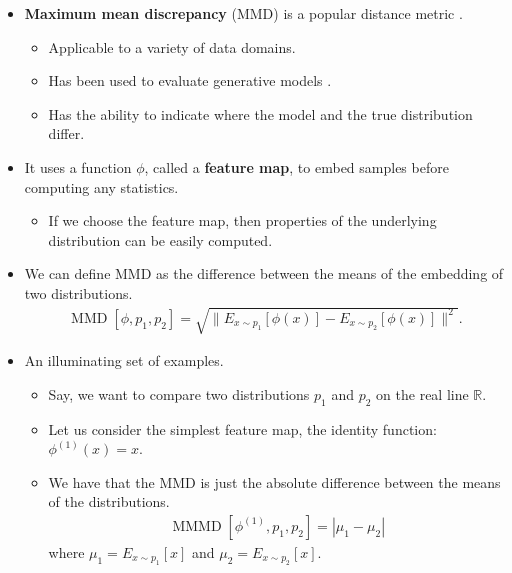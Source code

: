\documentclass[10pt]{article}
\begin{document}
\begin{itemize}
    \item {\bf Maximum mean discrepancy} (MMD) is a popular distance metric \cite{Gretton:2012}.
    \begin{itemize}
        \item Applicable to a variety of data domains.
        \item Has been used to evaluate generative models \cite{Sutherland:2021, Borji:2018,Lueckman:2021}.
        \item Has the ability to indicate where the model and the true distribution differ.
    \end{itemize}
    
    \item It uses a function $\phi$, called a {\bf feature map}, to embed samples before computing any statistics.
    \begin{itemize}
        \item If we choose the feature map, then properties of the underlying distribution can be easily computed.
    \end{itemize}

    \item We can define MMD as the difference between the means of the embedding of two distributions.
    \begin{align*}
        \operatorname{MMD}[\phi,p_1,p_2] = \sqrt{ \big\| E_{x \sim p_1}[\phi(x)] - E_{x \sim p_2}[\phi(x)] \big\|^2}.
    \end{align*}

    \item An illuminating set of examples.
    \begin{itemize}
        \item Say, we want to compare two distributions $p_1$ and $p_2$ on the real line $\mathbb{R}$.
        
        \item Let us consider the simplest feature map, the identity function: $\phi^{(1)}(x) = x$. 
        
        \item We have that the MMD is just the absolute difference between the means of the distributions.
        \begin{align*}
            \operatorname{MMMD}[\phi^{(1)}, p_1, p_2] = |\mu_1 - \mu_2|            
        \end{align*}
        where $\mu_1 = E_{x \sim p_1}[x]$ and $\mu_2 = E_{x \sim p_2}[x]$.


\end{itemize}
\end{itemize}
\end{document}

